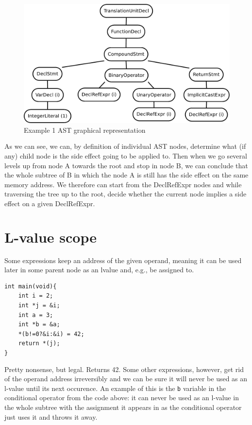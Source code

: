 \begin{figure}[H]
  \caption{Example 1 AST graphical representation}
  \centering
    \includegraphics[width=1\textwidth]{fig/example1G.pdf}
\end{figure}

As we can see, we can, by definition of individual AST nodes, determine what (if any) child node is the side effect going to be applied to. Then when we go several levels up from node A towards the root and stop in node B, we can conclude that the whole subtree of B in which the node A is still has the side effect on the same memory address. We therefore can start from the DeclRefExpr nodes and while traversing the tree up to the root, decide whether the current node implies a side effect on a given DeclRefExpr.

\section{L-value scope}
Some expressions keep an address of the given operand, meaning it can be used later in some parent node as an lvalue and, e.g., be assigned to.

\begin{lstlisting}
int main(void){
    int i = 2;
    int *j = &i;
    int a = 3;
    int *b = &a;
    *(b!=0?&i:&i) = 42;
    return *(j);
}

\end{lstlisting}

Pretty nonsense, but legal. Returns 42. Some other expressions, however, get rid of the operand address irreversibly and we can be sure it will never be used as an l-value until its next occurence. An example of this is the \verb|b| variable in the conditional operator from the code above: it can never be used as an l-value in the whole subtree with the assignment it appears in as the conditional operator just uses it and throws it away.


